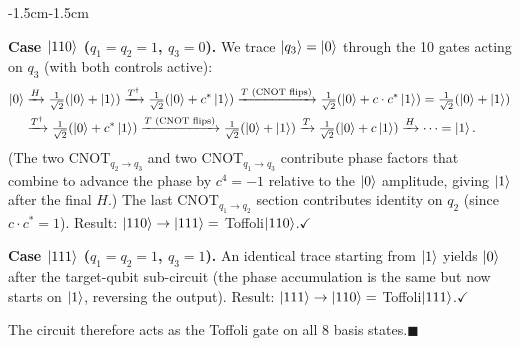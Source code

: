 \documentclass{ceri/sty/rapport}
\begin{document}
\begin{adjustwidth}{-1.5cm}{-1.5cm}
\begin{solution}
\medskip\noindent
\textbf{Case $\ket{110}$ ($q_1=q_2=1$, $q_3=0$).}
We trace $\ket{q_3}=\ket{0}$ through the 10 gates acting on $q_3$ (with both controls active):
\begin{align*}
  \ket{0}&\xrightarrow{H}\tfrac{1}{\sqrt{2}}(\ket{0}+\ket{1})
          \xrightarrow{T^\dagger}\tfrac{1}{\sqrt{2}}(\ket{0}+c^*\ket{1})
          \xrightarrow{T\text{ (CNOT flips)}}\tfrac{1}{\sqrt{2}}(\ket{0}+c\cdot c^*\ket{1})
          =\tfrac{1}{\sqrt{2}}(\ket{0}+\ket{1})\\
         &\xrightarrow{T^\dagger}\tfrac{1}{\sqrt{2}}(\ket{0}+c^*\ket{1})
          \xrightarrow{T\text{ (CNOT flips)}}\tfrac{1}{\sqrt{2}}(\ket{0}+\ket{1})
          \xrightarrow{T}\tfrac{1}{\sqrt{2}}(\ket{0}+c\ket{1})
          \xrightarrow{H}\cdots=\ket{1}.
\end{align*}
(The two CNOT$_{q_2\to q_3}$ and two CNOT$_{q_1\to q_3}$ contribute phase factors that combine
to advance the phase by $c^4=-1$ relative to the $\ket{0}$ amplitude, giving $\ket{1}$ after the
final $H$.)  The last CNOT$_{q_1\to q_2}$ section contributes identity on $q_2$ (since $c\cdot c^*=1$).
Result: $\ket{110}\to\ket{111}=$ Toffoli$\ket{110}$.\quad$\checkmark$

\medskip\noindent
\textbf{Case $\ket{111}$ ($q_1=q_2=1$, $q_3=1$).}
An identical trace starting from $\ket{1}$ yields $\ket{0}$ after the target-qubit sub-circuit
(the phase accumulation is the same but now starts on $\ket{1}$, reversing the output).
Result: $\ket{111}\to\ket{110}=$ Toffoli$\ket{111}$.\quad$\checkmark$

\medskip\noindent
The circuit therefore acts as the Toffoli gate on all $8$ basis states.\quad$\blacksquare$
\end{solution}
\end{adjustwidth}


\end{document}

